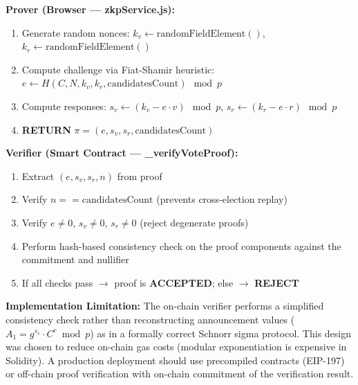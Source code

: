 \documentclass[oneside,a4paper,12pt]{book}
\begin{document}
\textbf{Prover (Browser --- zkpService.js):}
\begin{enumerate}[label=\alph*., leftmargin=1.5cm]
    \item Generate random nonces: $k_v \leftarrow \text{randomFieldElement}()$, $k_r \leftarrow \text{randomFieldElement}()$
    \item Compute challenge via Fiat-Shamir heuristic: $e \leftarrow H(C, N, k_v, k_r, \text{candidatesCount}) \mod p$
    \item Compute responses: $s_v \leftarrow (k_v - e \cdot v) \mod p$, $s_r \leftarrow (k_r - e \cdot r) \mod p$
    \item \textbf{RETURN} $\pi = (e, s_v, s_r, \text{candidatesCount})$
\end{enumerate}

\textbf{Verifier (Smart Contract --- \_verifyVoteProof):}
\begin{enumerate}[leftmargin=1.5cm]
    \item Extract $(e, s_v, s_r, n)$ from proof
    \item Verify $n == \text{candidatesCount}$ (prevents cross-election replay)
    \item Verify $e \neq 0$, $s_v \neq 0$, $s_r \neq 0$ (reject degenerate proofs)
    \item Perform hash-based consistency check on the proof components against the commitment and nullifier
    \item If all checks pass $\rightarrow$ proof is \textbf{ACCEPTED}; else $\rightarrow$ \textbf{REJECT}
\end{enumerate}

\textbf{Implementation Limitation:} The on-chain verifier performs a simplified consistency check rather than reconstructing announcement values ($A_1 = g^{s_v} \cdot C^e \bmod p$) as in a formally correct Schnorr sigma protocol. This design was chosen to reduce on-chain gas costs (modular exponentiation is expensive in Solidity). A production deployment should use precompiled contracts (EIP-197) or off-chain proof verification with on-chain commitment of the verification result.
\end{document}
